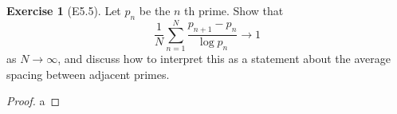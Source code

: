 \documentclass[reqno]{amsart}
\theoremstyle{definition}
\newtheorem{exercise}[theorem]{Exercise}
\theoremstyle{remark}
\begin{document}
\begin{exercise}[E5.5]
    Let $p_n$ be the $n$ th prime. Show that
    \[
    \frac{1}{N} \sum_{n=1}^{N} \frac{p_{n+1}- p_n}{\log p_n}
    \to 1
    \] 
    as $N \to \infty$, and discuss how to interpret
    this as a statement about the average
    spacing between adjacent primes.
\end{exercise}


\begin{proof}
    a
\end{proof}




\end{document}
